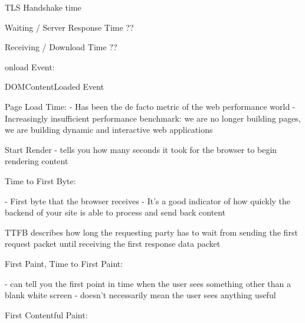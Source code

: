 TLS Handshake time %


Waiting / Server Response Time ?? %


Receiving / Download Time ?? %




onload Event: %


DOMContentLoaded Event %




Page Load Time: %
- Has been the de facto metric of the web performance world
- Increasingly insufficient performance benchmark: we are no longer building pages, we are building dynamic and interactive web applications




Start Render %
- tells you how many seconds it took for the browser to begin rendering content


Time to First Byte: %

- First byte that the browser receives
- It’s a good indicator of how quickly the backend of your site is able to process and send back content


TTFB describes how long the requesting party has to wait from sending the first request packet until receiving the first response data packet







First Paint, Time to First Paint: %


- can tell you the first point in time when the user sees something other than a blank white screen
- doesn’t necessarily mean the user sees anything useful




First Contentful Paint: %




